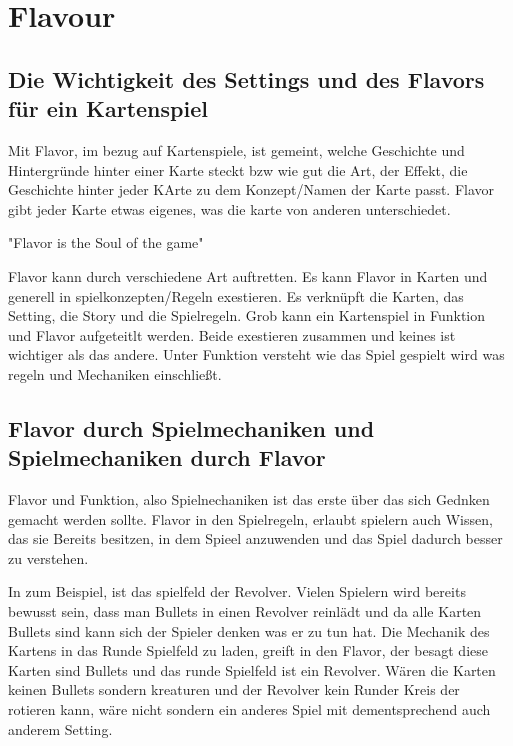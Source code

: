 
\section{Flavour}\label{sec:flavour}

\renewcommand{\kapitelautor}{Autor: Irgendwer} %

\subsection{Die Wichtigkeit des Settings und des Flavors für ein Kartenspiel}\label{subsec:wichtigkeit-des-flavours}

%
Mit Flavor, im bezug auf Kartenspiele, ist gemeint, welche Geschichte und Hintergründe hinter einer Karte steckt bzw wie gut die Art, der Effekt,
die Geschichte hinter jeder KArte zu dem Konzept/Namen der Karte passt. Flavor gibt jeder Karte etwas eigenes, was die karte von anderen unterschiedet.

"Flavor is the Soul of the game"\cite{soulOfTheGame}


Flavor kann durch verschiedene Art auftretten. Es kann Flavor in Karten und generell in spielkonzepten/Regeln exestieren.
Es verknüpft die Karten, das Setting, die Story und die Spielregeln. Grob kann ein Kartenspiel in Funktion und Flavor aufgeteitlt werden.
Beide exestieren zusammen und keines ist wichtiger als das andere. Unter Funktion versteht wie das Spiel gespielt wird was regeln und Mechaniken einschließt. \cite{flavorAndFunction}

%
\subsection{Flavor durch Spielmechaniken und Spielmechaniken durch Flavor}\label{subsec:flavour-durch-mechaniken}

Flavor und Funktion, also Spielnechaniken ist das erste über das sich Gednken gemacht werden sollte.
Flavor in den Spielregeln, erlaubt spielern auch Wissen, das sie Bereits besitzen, in dem Spieel anzuwenden und das Spiel dadurch besser zu verstehen. \cite{flavorAndFunction}


In \FF zum Beispiel, ist das spielfeld der Revolver. Vielen Spielern wird bereits bewusst sein, dass man Bullets in einen Revolver reinlädt und da alle Karten Bullets sind kann sich der Spieler
denken was er zu tun hat. Die Mechanik des Kartens in das Runde Spielfeld zu laden, greift in den Flavor, der besagt diese Karten sind Bullets und das runde Spielfeld ist ein Revolver.
Wären die Karten keinen Bullets sondern kreaturen und der Revolver kein Runder Kreis der rotieren kann, wäre \FF nicht \FF sondern ein anderes Spiel mit dementsprechend auch anderem Setting.


